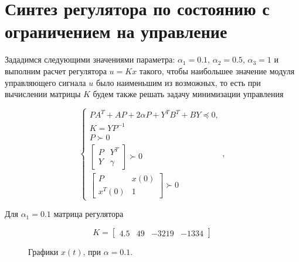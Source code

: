 \section{Синтез регулятора по состоянию с ограничением на управление}

Зададимся следующими значениями параметра: $\alpha_1= 0.1$, $\alpha_2 = 0.5$, $\alpha_3 = 1$ и выполним расчет регулятора $u=Kx$ такого, чтобы наибольшее значение модуля управляющего сигнала $u$ было наименьшим из возможных, то есть при вычислении матрицы $K$ будем также решать задачу минимизации управления

\begin{equation}
    \begin{cases}
      PA^T+AP+2 \alpha P + Y^T B^T+BY \preceq 0,\\
        K = Y P^{-1}\\
        P \succ 0\\
        \begin{bmatrix}
            P & Y^T\\
            Y & \gamma
        \end{bmatrix} \succ 0\\[2pt]
        \begin{bmatrix}
            P & x(0)\\
            x^T(0) & 1
        \end{bmatrix} \succ 0
    \end{cases},
\end{equation}

Для $\alpha_1=0.1$ матрица регулятора

\begin{equation}
    K = \begin{bmatrix}
        4.5 & 49 & -3219 & -1334
    \end{bmatrix}
\end{equation}

\begin{figure}[!h]
\caption{Графики $x(t)$, при $\alpha = 0.1$.}
\label{4_3_1}
\end{figure}




